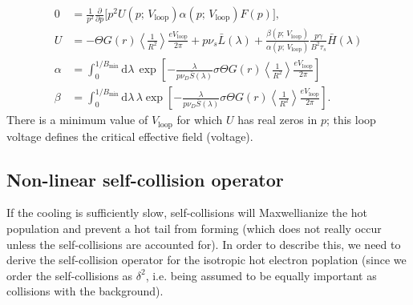 \documentclass[11pt,a4paper]{article}
\newcommand{\rd}{\ensuremath{\mathrm{d}}}
\newcommand{\sub}[1]{\ensuremath{_{\text{#1}}}}
\begin{document}
\begin{align}
0 &= \frac{1}{p^2}\frac{\partial }{\partial p}\Big[p^2 U(p; \,V\sub{loop}) \alpha(p;\,V\sub{loop}) F(p)\Big], \nonumber \\
U &= -\Theta G(r) \left\langle\frac{1}{R^2}\right\rangle\frac{e V\sub{loop}}{2\pi} + p\nu_s \bar{L}(\lambda) + \frac{\beta(p;\,V\sub{loop})}{\alpha(p;\,V\sub{loop})}\frac{p\gamma}{B^2\tau_s}\bar{H}(\lambda) \\
\alpha &=  \int_0^{1/B\sub{min}}\rd \lambda \,  \exp\left[ - \frac{\lambda}{p\nu_D \bar{S}(\lambda)}\sigma\Theta G(r) \left\langle\frac{1}{R^2}\right\rangle\frac{e V\sub{loop}}{2\pi} \right] \nonumber \\
\beta &= \int_0^{1/B\sub{min}}\rd \lambda \,  \lambda \exp\left[ - \frac{\lambda}{p\nu_D \bar{S}(\lambda)}\sigma\Theta G(r) \left\langle\frac{1}{R^2}\right\rangle\frac{e V\sub{loop}}{2\pi} \right] \nonumber.
\end{align}
There is a minimum value of $V\sub{loop}$ for which $U$ has real zeros in $p$; this loop voltage defines the critical effective field (voltage).



\subsection{Non-linear self-collision operator}
If the cooling is sufficiently slow, self-collisions will Maxwellianize the hot population and prevent a hot tail from forming (which does not really occur unless the self-collisions are accounted for). In order to describe this, we need to derive the self-collision operator for the isotropic hot electron poplation (since we order the self-collisions as $\delta^2$, i.e. being assumed to be equally important as collisions with the background). 
\end{document}
